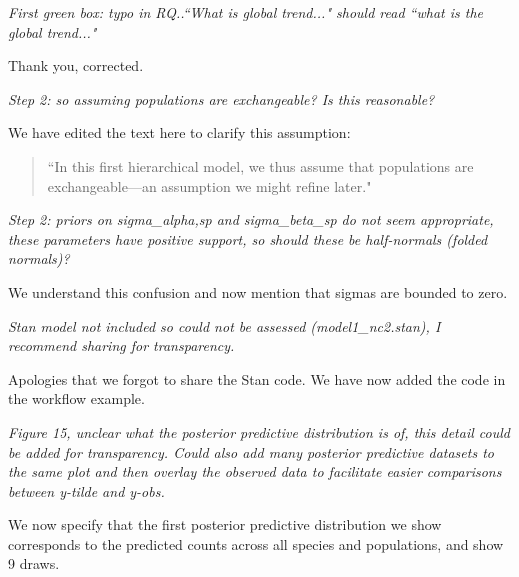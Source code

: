 \documentclass[11pt,letter]{article}
\begin{document}
\begin{mybox}
\emph{First green box: typo in RQ..``What is global trend..." should read
``what is the global trend..."}
\end{mybox}

Thank you, corrected.

\begin{mybox}
\emph{Step 2: so assuming populations are exchangeable? Is this reasonable?}
\end{mybox}

We have edited the text here to clarify this assumption:
\begin{quote}
``In this first hierarchical model, we thus assume that populations are exchangeable---an assumption we might refine later."
\end{quote}


\begin{mybox}
\emph{Step 2: priors on sigma\_alpha,sp and sigma\_beta\_sp do not seem
appropriate, these parameters have positive support, so should these be
half-normals (folded normals)?}
\end{mybox}

We understand this confusion and now mention that sigmas are bounded to zero.

\begin{mybox}
\emph{Stan model not included so could not be assessed (model1\_nc2.stan), I
recommend sharing for transparency.}
\end{mybox}

Apologies that we forgot to share the Stan code. We have now added the code in the workflow example.

\begin{mybox}
\emph{Figure 15, unclear what the posterior predictive distribution is of,
this detail could be added for transparency. Could also add many
posterior predictive datasets to the same plot and then overlay the
observed data to facilitate easier comparisons between y-tilde and y-obs.}
\end{mybox}

We now specify that the first posterior predictive distribution we show corresponds to the predicted counts across all species and populations, and show 9 draws.
\end{document}
